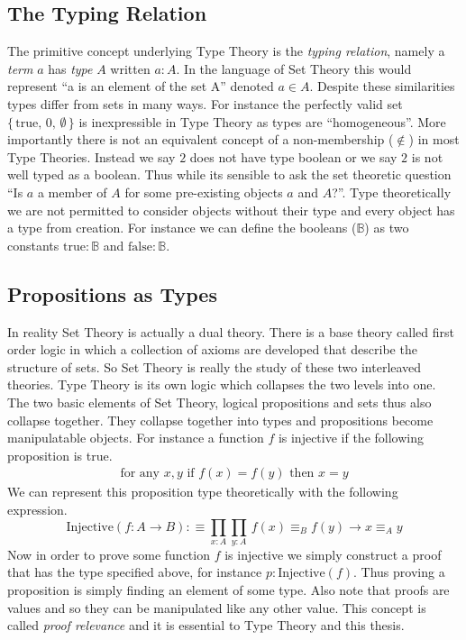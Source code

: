 \documentclass[./Thesis.tex]{subfiles}
\begin{document}
\subsection{The Typing Relation}
\label{sec:typing-relation}
The primitive concept underlying Type Theory is the \textit{typing relation},
namely a \textit{term} $a$ has \textit{type} $A$ written $a : A$. In the
language of Set Theory this would represent ``a is an element of the set A''
denoted $a \in A$. Despite these similarities types differ from sets in many
ways. For instance the perfectly valid set
$\{ \, \text{true}, \, 0, \, \emptyset \, \}$
is inexpressible in Type Theory as types are ``homogeneous''. More importantly
there is not an equivalent concept of a non-membership ($\notin$) in most Type
Theories. Instead we say $2$ does not have type boolean or we say $2$ is not
well typed as a boolean. Thus while its sensible to ask the set theoretic question
``Is $a$ a member of $A$ for some pre-existing objects $a$ and $A$?''. Type
theoretically we are not permitted to consider objects without their type and
every object has a type from creation. For instance we can define the booleans
($𝔹$) as two constants $\text{true} : 𝔹$ and $\text{false} : 𝔹$.
\subsection{Propositions as Types}
In reality Set Theory is actually a dual theory. There is a base theory called
first order logic in which a collection of axioms are developed that describe
the structure of sets. So Set Theory is really the study of these two
interleaved theories. Type Theory is its own logic which collapses the two
levels into one. The two basic elements of Set Theory, logical propositions and
sets thus also collapse together. They collapse together into types and
propositions become manipulatable objects. For instance
a function $f$ is injective if the following proposition is true.
\begin{align}
  \text{for any } x, y \text{ if } f(x) = f(y) \text{ then } x = y
\end{align}
We can represent this proposition type theoretically with the following
expression. 
\begin{equation}
  \label{eqn:injective}
  \text{Injective}(f : A \to B) :\equiv \prod_{x : A} \prod_{y : A} \, f(x) \equiv_B f(y) \to x \equiv_A y
\end{equation}
Now in order to prove some function $f$ is injective we simply construct a proof
that has the type specified above, for instance $p : \text{Injective}(f)$.
Thus proving a proposition is simply finding an element of some type.
Also note that proofs are values and so they can be
manipulated like any other value. This concept is called
\textit{proof relevance} and it is essential to Type Theory and this thesis.
\end{document}
